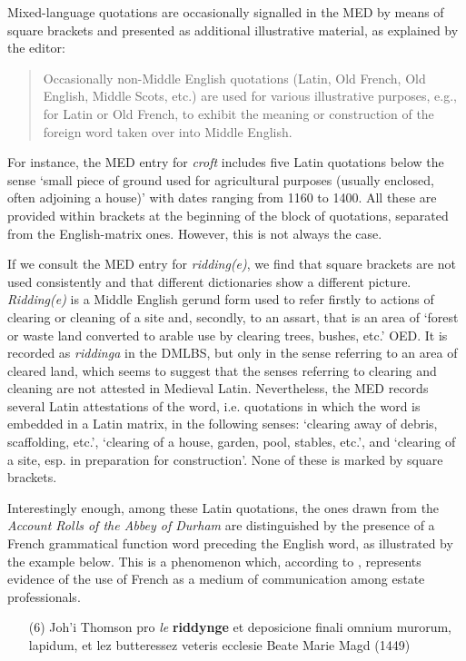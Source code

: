 \documentclass[output=paper,colorlinks,citecolor=brown,arabicfont,chinesefont]{langscibook}
\begin{document}
Mixed-language quotations are occasionally signalled in the MED by means of square brackets and presented as additional illustrative material, as explained by the editor:

\begin{quote}
    Occasionally non-Middle English quotations (Latin, Old French, Old English, Middle Scots, etc.) are used for various illustrative purposes, e.g., for Latin or Old French, to exhibit the meaning or construction of the foreign word taken over into Middle English. \hfill\citep[19]{Lewis2007}\hbox{}
\end{quote}

For instance, the MED entry for \emph{croft} includes five Latin quotations below the sense ‘small piece of ground used for agricultural purposes (usually enclosed, often adjoining a house)’ with dates ranging from 1160 to 1400. All these are provided within brackets at the beginning of the block of quotations, separated from the English-matrix ones. However, this is not always the case.

If we consult the MED entry for \emph{ridding(e)}, we find that square brackets are not used consistently and that different dictionaries show a different picture. \emph{Ridding(e)} is a Middle English gerund form used to refer firstly to actions of clearing or cleaning of a site and, secondly, to an assart, that is an area of ‘forest or waste land converted to arable use by clearing trees, bushes, etc.’ OED. It is recorded as \emph{riddinga} in the DMLBS, but only in the sense referring to an area of cleared land, which seems to suggest that the senses referring to clearing and cleaning are not attested in Medieval Latin. Nevertheless, the MED records several Latin attestations of the word, i.e. quotations in which the word is embedded in a Latin matrix, in the following senses: ‘clearing away of debris, scaffolding, etc.’, ‘clearing of a house, garden, pool, stables, etc.’, and ‘clearing of a site, esp. in preparation for construction’. None of these is marked by square brackets.

Interestingly enough, among these Latin quotations, the ones drawn from the \emph{Account Rolls of the Abbey of Durham} are distinguished by the presence of a French grammatical function word preceding the English word, as illustrated by the example below. This is a phenomenon which, according to \citet{Ingham2009}, represents evidence of the use of French as a medium of communication among estate professionals.

\begin{itemize}
    \item [(6)] Joh'i Thomson pro \emph{le} \textbf{riddynge} et deposicione finali omnium murorum, lapidum, et lez butteressez veteris ecclesie Beate Marie Magd (1449)
\end{itemize}
\end{document}
